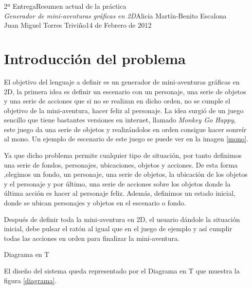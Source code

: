 \documentclass[11pt,a4paper,spanish,twoside]{book}
\makeatletter
\renewcommand{\section}{
  \@startsection{section}{1}{0mm}{\baselineskip}
  {2.5mm}{\Large\bf}
}
\theoremstyle{plain} \newtheorem{nota}{Nota}
\makeatother
\begin{document}
{2ª Entrega}{Resumen actual de la práctica\\\emph{Generador de mini-aventuras 
gráficas en 2D}}{Alicia Martín-Benito Escalona\\Juan Miguel Torres Triviño}{14 
de Febrero de 2012}  


\tableofcontents
\listoftables
\listoffigures
\chapter{Introducción del problema}
El objetivo del lenguaje a definir es un generador de mini-aventuras gráficas 
en 2D, la primera idea es definir un escenario con un personaje, una serie de 
objetos y una serie de acciones que si no se realizan en dicho orden, no se 
cumple el objetivo de la mini-aventura, hacer feliz al personaje. La idea surgió
de un juego sencillo que tiene bastantes versiones en internet, llamado 
\emph{Monkey Go Happy}, este juego da una serie de objetos y realizándolos en 
orden consigue hacer sonreír al mono. Un ejemplo de escenario de este juego se 
puede ver en la imagen \ref{mono}.

Ya que dicho problema permite cualquier tipo de situación, por tanto definimos 
una serie de fondos, personajes, ubicaciones, objetos y acciones. De esta forma
,elegimos un fondo, un personaje, una serie de objetos, la ubicación de los 
objetos y el personaje y por último, una serie de acciones sobre los objetos 
donde la última acción es hacer al personaje feliz. Además, definimos un 
estado inicial, donde se ubican personajes y objetos en el escenario o fondo.

Después de definir toda la mini-aventura en 2D, el usuario dándole la situación
inicial, debe pulsar el ratón al igual que en el juego de ejemplo y así cumplir
todas las acciones en orden para finalizar la mini-aventura.
 
\section{Diagrama en T}

El diseño del sistema queda representado por el Diagrama en T que muestra la
figura \ref{diagrama}.
\end{document}
